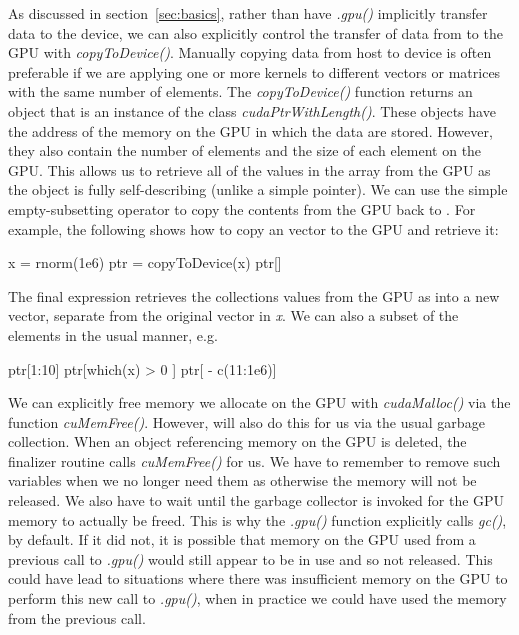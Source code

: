 \documentclass[article]{jss}
\def\R{\proglang{R}}
\def\Rfunc#1{\textsl{#1()}}
\def\Rvar#1{\textsl{#1}}
\def\Cfunc#1{\textit{#1()}}
\def\Rarg#1{\textbf{#1}}
\begin{document}
%

As discussed in section~\ref{sec:basics}, rather than have \Rfunc{.gpu}
implicitly transfer data to the device, we can also explicitly control
the transfer of data from \R{} to the GPU with \Rfunc{copyToDevice}.
Manually copying data from host to device is often preferable if
we are applying one or more kernels to different \R{} vectors or matrices
with the same number of elements. The \Rfunc{copyToDevice} function 
returns an object that is an instance
of the class \Rfunc{cudaPtrWithLength}.  These objects have the
address of the memory on the GPU in which the data are
stored. However, they also contain the number of elements and the size
of each element on the GPU.  This allows us to retrieve all of the
values in the array from the GPU as the object is fully
self-describing (unlike a simple pointer).
We can use the simple empty-subsetting operator to copy the
contents from the GPU back to \R. For example, the following
shows how to copy an \R{} vector to the GPU and retrieve it:
\begin{RCode}
x = rnorm(1e6)
ptr = copyToDevice(x)
ptr[]
\end{RCode}
The final expression retrieves the collections values from the GPU as
into a new \R{} vector, separate from the original vector in \Rvar{x}.
We can also a subset of the  elements in the usual manner, e.g.
\begin{RCode}
ptr[1:10]
ptr[which(x) > 0 ]
ptr[ - c(11:1e6)]
\end{RCode}

We can explicitly free memory we allocate on the GPU with
\Rfunc{cudaMalloc} via the function \Rfunc{cuMemFree}.  However, \R{}
will also do this for us via the usual garbage collection.  When an \R{}
object referencing memory on the GPU is deleted, the finalizer routine
calls \Cfunc{cuMemFree} for us.  We have to remember to remove such
variables when we no longer need them as otherwise the memory will not
be released.  We also have to wait until the \R{} garbage collector is
invoked for the GPU memory to actually be freed.  This is why the
\Rfunc{.gpu} function explicitly calls \Rfunc{gc}, by default. If it
did not, it is possible that memory on the GPU used from a previous
call to \Rfunc{.gpu} would still appear to be in use and so not
released. This could have lead to situations where there was 
insufficient memory on the GPU to perform this new call to \Rfunc{.gpu},
when in practice we could have used the memory from the previous call.
\end{document}
